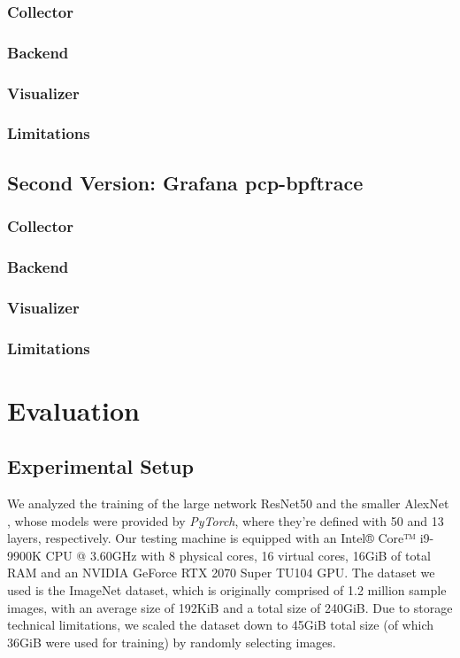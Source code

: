 \documentclass[conference]{IEEEtran}
\begin{document}
\subsubsection{Collector}

\subsubsection{Backend}

\subsubsection{Visualizer}

\subsubsection{Limitations}

\subsection{Second Version: Grafana pcp-bpftrace}

\subsubsection{Collector}

\subsubsection{Backend}

\subsubsection{Visualizer}

\subsubsection{Limitations}

\section{Evaluation}

\subsection{Experimental Setup}

We analyzed the training of the large network ResNet50 \cite{resnet50} and the smaller AlexNet \cite{alexnet}, whose models were
provided by \textit{PyTorch}, where they're defined with 50 and 13 layers, respectively. Our testing machine is equipped with an Intel® Core™ i9-9900K CPU @ 3.60GHz with
8 physical cores, 16 virtual cores, 16GiB of total RAM and an NVIDIA GeForce RTX 2070 Super TU104 GPU. The dataset we used is the ImageNet \cite{imagenet} dataset, which is originally comprised of 1.2 million sample images, with an average size of 192KiB and a total size of 240GiB. Due to storage technical limitations, we scaled the dataset down to 45GiB total size (of which 36GiB were used for training) by randomly selecting images.
\end{document}
